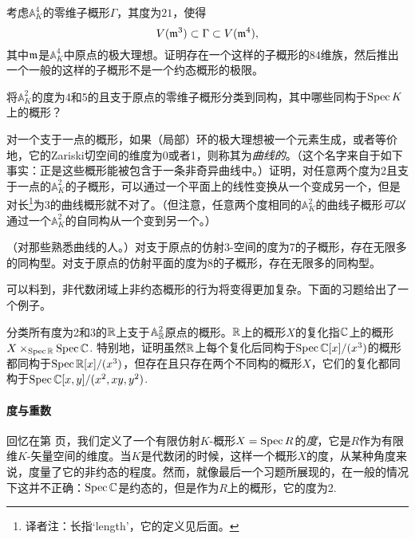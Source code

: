 \begin{exe}
	考虑$\mathbb{A}_K^4$的零维子概形$\Gamma$，其度为$21$，使得
	\[
	V(\mathfrak{m}^3)\subset \Gamma \subset V(\mathfrak{m}^4),
	\]
	其中$\mathfrak{m}$是$\mathbb{A}_K^4$中原点的极大理想。证明存在一个这样的子概形的$84$维族，然后推出一个一般的这样的子概形不是一个约态概形的极限。
\end{exe}

\begin{exe}
	将$\mathbb{A}_K^2$的度为4和5的且支于原点的零维子概形分类到同构，其中哪些同构于$\operatorname{Spec} K$上的概形？
\end{exe}

\begin{exe}
	对一个支于一点的概形，如果（局部）环的极大理想被一个元素生成，或者等价地，它的Zariski切空间的维度为0或者1，则称其为\textit{曲线的}。（这个名字来自于如下事实：正是这些概形能被包含于一条非奇异曲线中。）证明，对任意两个度为2且支于一点的$\mathbb{A}_K^2$的子概形，可以通过一个平面上的线性变换从一个变成另一个，但是对长\footnote{译者注：长指`length'，它的定义见后面。}为3的曲线概形就不对了。（但注意，任意两个度相同的$\mathbb{A}_K^2$的曲线子概形\textit{可以}通过一个$\mathbb{A}_K^2$的自同构从一个变到另一个。）
\end{exe}

\begin{exe}
	（对那些熟悉曲线的人。）对支于原点的仿射$3$\hyp 空间的度为7的子概形，存在无限多的同构型。对支于原点的仿射平面的度为8的子概形，存在无限多的同构型。
\end{exe}

可以料到，非代数闭域上非约态概形的行为将变得更加复杂。下面的习题给出了一个例子。

\begin{exe}
	分类所有度为2和3的$\mathbb{R}$上支于$\mathbb{A}_{\mathbb{R}}^2$原点的概形。$\mathbb{R}$上的概形$X$的复化指$\mathbb{C}$上的概形$X\times_{\operatorname{Spec} \mathbb{R}}\operatorname{Spec} \mathbb{C}$. 特别地，证明虽然$\mathbb{R}$上每个复化后同构于$\operatorname{Spec} \mathbb{C}[x]/(x^3)$的概形都同构于$\operatorname{Spec} \mathbb{R}[x]/(x^3)$，但存在且只存在两个不同构的概形$X$，它们的复化都同构于$\operatorname{Spec} \mathbb{C}[x,y]/(x^2,xy,y^2)$.
\end{exe}

\paragraph*{度与重数}
回忆在第 \pageref{deg} 页，我们定义了一个有限仿射$K$\hyp 概形$X=\operatorname{Spec} R$的\textit{度}，它是$R$作为有限维$K$\hyp 矢量空间的维度。当$K$是代数闭的时候，这样一个概形$X$的度，从某种角度来说，度量了它的非约态的程度。然而，就像最后一个习题所展现的，在一般的情况下这并不正确：$\operatorname{Spec} \mathbb{C}$是约态的，但是作为$R$上的概形，它的度为2.

